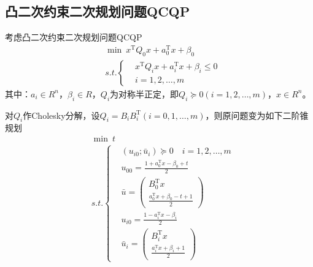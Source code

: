     \subsection{凸二次约束二次规划问题QCQP}
        \par
        考虑凸二次约束二次规划问题QCQP
        \begin{align*}
          & \mathop{\min} \  x^\mathrm{T} Q_0x+a_0^\mathrm{T} x+{\beta}_0\\
          & s.t.\left\{
            \begin{aligned}
             &x^\mathrm{T} Q_ix+a_i^\mathrm{T} x+{\beta}_i \leqslant 0\\
             &i =1,2,\ldots,m
            \end{aligned}
             \right.
        \end{align*}
        其中：$a_i \in R^n$，${\beta}_i \in R$，$Q_i$为对称半正定，即$Q_i \succeq 0(i=1,2,\ldots,m)$，$x \in R^n$。
        \par
        对$Q_i$作Cholesky分解，设$Q_i=B_iB_i^\mathrm{T} (i=0,1,\ldots,m)$，则原问题变为如下二阶锥规划
        \begin{align*}
          & \mathop{\min}\ t\\
          & s.t.
          \left\{
          \begin{aligned}
          &(u_{i0};{\bar{u}}_i)\succeq 0\quad i=1,2,\ldots,m\\
          &u_{00}=\frac{1+a_0^\mathrm{T} x-{\beta}_0+t}{2}\\
          &\bar{u}=\begin{pmatrix} B_0^\mathrm{T} x \\\frac{a_0^\mathrm{T} x+{\beta}_0-t+1}{2}\end{pmatrix}\\
         & u_{i0}=\frac{1-a_i^\mathrm{T} x-{\beta}_i}{2}\\
          &{\bar{u}}_i=\begin{pmatrix} B_i^\mathrm{T} x \\\frac{a_i^\mathrm{T} x+{\beta}_i+1}{2}\end{pmatrix}
          \end{aligned}
          \right.
        \end{align*}

